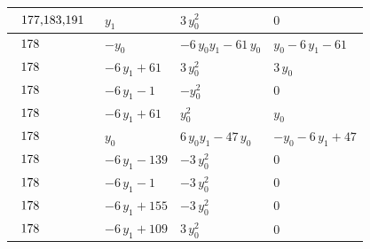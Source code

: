 \begin{table}[H]
\begin{center}
{\begin{tabular}{|l|l|l|l|}
$\begin{tabular}{l}
177,183,191 \\
\end{tabular}$ & $ y_{1} $ & $ 3 \, y_{0}^{2} $ & $ 0 $ \\ \hline
$\begin{tabular}{l}
178 \\
\end{tabular}$ & $ -y_{0} $ & $ -6 \, y_{0} y_{1} - 61 \, y_{0} $ & $ y_{0} - 6 \, y_{1} - 61 $ \\ \hline
$\begin{tabular}{l}
178 \\
\end{tabular}$ & $ -6 \, y_{1} + 61 $ & $ 3 \, y_{0}^{2} $ & $ 3 \, y_{0} $ \\ \hline
$\begin{tabular}{l}
178 \\
\end{tabular}$ & $ -6 \, y_{1} - 1 $ & $ -y_{0}^{2} $ & $ 0 $ \\ \hline
$\begin{tabular}{l}
178 \\
\end{tabular}$ & $ -6 \, y_{1} + 61 $ & $ y_{0}^{2} $ & $ y_{0} $ \\ \hline
$\begin{tabular}{l}
178 \\
\end{tabular}$ & $ y_{0} $ & $ 6 \, y_{0} y_{1} - 47 \, y_{0} $ & $ -y_{0} - 6 \, y_{1} + 47 $ \\ \hline
$\begin{tabular}{l}
178 \\
\end{tabular}$ & $ -6 \, y_{1} - 139 $ & $ -3 \, y_{0}^{2} $ & $ 0 $ \\ \hline
$\begin{tabular}{l}
178 \\
\end{tabular}$ & $ -6 \, y_{1} - 1 $ & $ -3 \, y_{0}^{2} $ & $ 0 $ \\ \hline
$\begin{tabular}{l}
178 \\
\end{tabular}$ & $ -6 \, y_{1} + 155 $ & $ -3 \, y_{0}^{2} $ & $ 0 $ \\ \hline
$\begin{tabular}{l}
178 \\
\end{tabular}$ & $ -6 \, y_{1} + 109 $ & $ 3 \, y_{0}^{2} $ & $ 0 $ \\ \hline

\end{tabular}}
\end{center}
\end{table}
